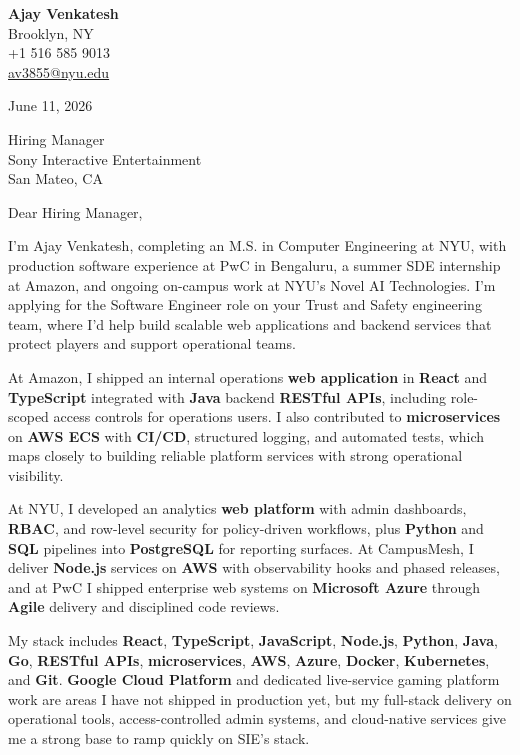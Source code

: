 \documentclass[letterpaper,11pt]{article}
\begin{document}
\begin{flushleft}
\textbf{\large Ajay Venkatesh} \\
Brooklyn, NY \\
+1 516 585 9013 \\
\href{mailto:av3855@nyu.edu}{av3855@nyu.edu}
\end{flushleft}
\vspace{10pt}
June 11, 2026
\vspace{6pt}

Hiring Manager \\
Sony Interactive Entertainment \\
San Mateo, CA

\vspace{10pt}

Dear Hiring Manager,

I'm Ajay Venkatesh, completing an M.S. in Computer Engineering at NYU, with production software experience at PwC in Bengaluru, a summer SDE internship at Amazon, and ongoing on-campus work at NYU's Novel AI Technologies. I'm applying for the Software Engineer role on your Trust and Safety engineering team, where I'd help build scalable web applications and backend services that protect players and support operational teams.

At Amazon, I shipped an internal operations \textbf{web application} in \textbf{React} and \textbf{TypeScript} integrated with \textbf{Java} backend \textbf{RESTful APIs}, including role-scoped access controls for operations users. I also contributed to \textbf{microservices} on \textbf{AWS ECS} with \textbf{CI/CD}, structured logging, and automated tests, which maps closely to building reliable platform services with strong operational visibility.

At NYU, I developed an analytics \textbf{web platform} with admin dashboards, \textbf{RBAC}, and row-level security for policy-driven workflows, plus \textbf{Python} and \textbf{SQL} pipelines into \textbf{PostgreSQL} for reporting surfaces. At CampusMesh, I deliver \textbf{Node.js} services on \textbf{AWS} with observability hooks and phased releases, and at PwC I shipped enterprise web systems on \textbf{Microsoft Azure} through \textbf{Agile} delivery and disciplined code reviews.

My stack includes \textbf{React}, \textbf{TypeScript}, \textbf{JavaScript}, \textbf{Node.js}, \textbf{Python}, \textbf{Java}, \textbf{Go}, \textbf{RESTful APIs}, \textbf{microservices}, \textbf{AWS}, \textbf{Azure}, \textbf{Docker}, \textbf{Kubernetes}, and \textbf{Git}. \textbf{Google Cloud Platform} and dedicated live-service gaming platform work are areas I have not shipped in production yet, but my full-stack delivery on operational tools, access-controlled admin systems, and cloud-native services give me a strong base to ramp quickly on SIE's stack.
\end{document}
